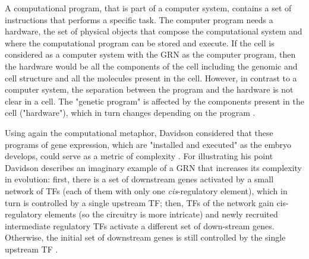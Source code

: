 A computational program, that is part of a computer system, contains a set of instructions that performs a specific task. The computer program needs a hardware, the set of physical objects that compose the computational system and where the computational program can be stored and execute.
If the cell is considered as a computer system with the GRN as the computer program, then the hardware would be all the components of the cell including the genomic and cell structure and all the molecules present in the cell.
However, in contrast to a computer system, the separation between the program and the hardware is not clear in a cell. The "genetic program" is affected by the components present in the cell ("hardware"), which in turn changes depending on the program \citep{susan2000ontogeny,Jaeger2014devmech}.
%

Using again the computational metaphor, Davidson considered that these programs of gene expression, which are "installed and executed" as the embryo develops, could serve as a metric of complexity \citep{Davidson2001}. For illustrating his point Davidson describes an imaginary example of a GRN that increases its complexity in evolution: first, there is a set of downstream genes activated by a small network of TFs (each of them with only one \textit{cis}-regulatory element), which in turn is controlled by a single upstream TF; then, TFs of the network gain cis-regulatory elements (so the circuitry is more intricate) and newly recruited intermediate regulatory TFs activate a different set of down-stream genes. Otherwise, the initial set of downstream genes is still controlled by the single upstream TF \citep{Davidson2001}.
   
